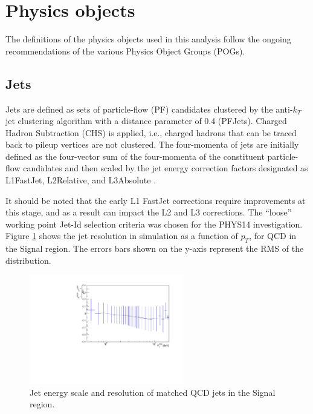 \section{Physics objects}
\label{sec:objects}
The definitions of the physics objects used in this analysis follow the ongoing recommendations of the various Physics Object Groups (POGs). 

\subsection{Jets}
\label{sec:jetreco}
Jets are defined as sets of particle-flow (PF) candidates clustered by the
anti-$k_{T}$ jet clustering algorithm \cite{Cacciari:2008gp} with a distance parameter of 0.4
(PFJets). Charged Hadron Subtraction (CHS) is applied, i.e., charged
hadrons that can be traced back to pileup vertices are not clustered.
The four-momenta of jets are initially defined as the four-vector sum of
the four-momenta of the constituent particle-flow candidates and then
scaled by the jet energy correction factors designated as L1FastJet,
L2Relative, and L3Absolute \cite{Chatrchyan:2011ds}.

It should be noted that the early L1 FastJet corrections require
improvements at this stage, and as a result can impact the L2 and L3
corrections. The ``loose'' working point Jet-Id selection criteria was
chosen for the PHYS14 investigation. Figure \ref{fig:QCDJets} shows the
jet resolution in simulation as a function of $p_{T}$, for QCD in the Signal region. The errors bars
shown on the y-axis represent the RMS of the distribution.

\begin{figure}[h]
  \centering
  \includegraphics[width=0.6\textwidth]{figures/PhysicsObjectsPlots/JetResQCDVarBinWidthv3.pdf}
  \caption{Jet energy scale and resolution of matched QCD jets in the Signal region.}
  \label{fig:QCDJets}
\end{figure}
   

